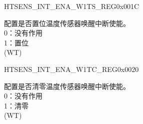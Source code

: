 \begin{register}{H}{TSENS\_INT\_ENA\_W1TS\_REG}{0x001C}\label{regdesc:TSENSINTENAW1TSREG}
%
%
\regnewline%
\begin{regdesc}\begin{reglist}
\label{fielddesc:TSENSCOCPUTSENSWAKEINTENAW1TS}\item [TSENS\_COCPU\_TSENS\_WAKE\_INT\_ENA\_W1TS] 配置是否置位温度传感器唤醒中断使能。\\
0：没有作用\\
1：置位\\
(WT)
\end{reglist}\end{regdesc}
\end{register}


\begin{register}{H}{TSENS\_INT\_ENA\_W1TC\_REG}{0x0020}\label{regdesc:TSENSINTENAW1TCREG}
%
%
\regnewline%
\begin{regdesc}\begin{reglist}
\label{fielddesc:TSENSCOCPUTSENSWAKEINTENAW1TC}\item [TSENS\_COCPU\_TSENS\_WAKE\_INT\_ENA\_W1TC] 配置是否清零温度传感器唤醒中断使能。\\
0：没有作用\\
1：清零\\
(WT)
\end{reglist}\end{regdesc}
\end{register}


